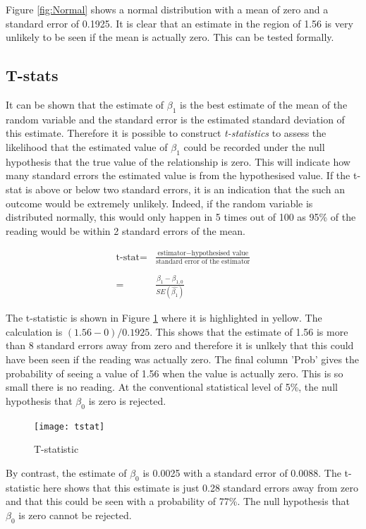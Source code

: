 \documentclass{article}\usepackage{graphicx, color}
\begin{document}
Figure \ref{fig:Normal} shows a normal distribution with a mean of zero and a standard error of 0.1925.  It is clear that an estimate in the region of 1.56 is very unlikely to be seen if the mean is actually zero.  This can be tested formally. 

\subsection{T-stats}
It can be shown that the estimate of $\beta_1$ is the best estimate of the mean of the random variable and the standard error is the estimated standard deviation of this estimate.  Therefore it is possible to construct \emph{t-statistics} to assess the likelihood that the estimated value of $\beta_1$ could be recorded under the null hypothesis that the true value of the relationship is zero. This will indicate how many standard errors the estimated value is from the hypothesised value.  If the t-stat is above or below two standard errors, it is an indication that the such an outcome would be extremely unlikely.  Indeed, if the random variable is distributed normally, this would only happen in 5 times out of 100 as 95\% of the reading would be within 2 standard errors of the mean.

\begin{align*}
\text{t-stat} =& \frac{\text{estimator} - \text{hypothesised value}}{\text{standard error of the estimator}}\\
\\[0.1cm]
 =& \frac{\hat{\beta_1}-\beta_{1,0}}{SE(\hat{\beta_1})}
\end{align*}

The t-statistic is shown in Figure \ref{TS} where it is highlighted in yellow.  The calculation is $(1.56 - 0)/0.1925$. This shows that the estimate of 1.56 is more than 8 standard errors away from zero and therefore it is unlkely that this could have been seen if the reading was actually zero.  The final column 'Prob' gives the probability of seeing a value of 1.56 when the value is actually zero.  This is so small there is no reading.  At the conventional statistical level of 5\%, the null hypothesis that $\beta_0$ is zero is rejected.  

\begin{figure}[h!]
\graphicspath{{"../Eviews/Figures/"}}
\centering
\texttt{[image: tstat]}
\caption{T-statistic}
\label{TS}
\end{figure}

By contrast, the estimate of $\beta_0$ is 0.0025 with a standard error of  0.0088.  The t-statistic here shows that this estimate is just 0.28 standard errors away from zero and that this could be seen with a probability of 77\%. The null hypothesis that $\beta_0$ is zero cannot be rejected. 
\end{document}
